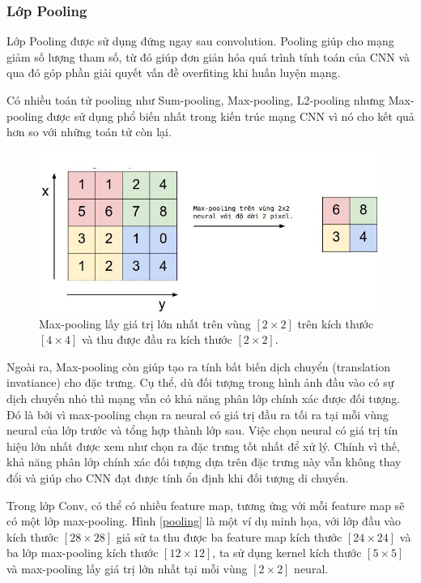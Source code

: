 \subsubsection{Lớp Pooling}
	Lớp Pooling được sử dụng đứng ngay sau convolution. Pooling giúp cho mạng giảm số lượng tham số, từ đó giúp đơn giản hóa quá trình tính toán của CNN và qua đó góp phần giải quyết vấn đề overfiting khi huấn luyện mạng. \par
	Có nhiều toán tử pooling như Sum-pooling, Max-pooling, L2-pooling nhưng Max-pooling được sử dụng phổ biến nhất trong kiến trúc mạng CNN vì nó cho kết quả hơn so với những toán tử còn lại. \par

\begin{figure}[ht]
  			\begin{center}
    				\includegraphics[scale=0.5]{maxpool} 
    				\caption{Max-pooling lấy giá trị lớn nhất trên vùng $[2\times2]$ trên kích thước $[4\times4]$ và thu được đầu ra kích thước $[2\times2]$.}
    				\label{maxpool}
  			\end{center}
\end{figure}	

	Ngoài ra, Max-pooling còn giúp tạo ra tính bất biến dịch chuyển (translation invatiance) cho đặc trưng. Cụ thể, dù đối tượng trong hình ảnh đầu vào có sự dịch chuyển nhỏ thì mạng vẫn có khả năng phân lớp chính xác được đối tượng. Đó là bởi vì max-pooling chọn ra neural có giá trị đầu ra tối ra tại mỗi vùng neural của lớp trước và tổng hợp thành lớp sau. Việc chọn neural có giá trị tín hiệu lớn nhất được xem như chọn ra đặc trưng tốt nhất để xử lý. Chính vì thế, khả năng phân lớp chính xác đối tượng dựa trên đặc trưng này vẫn không thay đổi và giúp cho CNN đạt được tính ổn định khi đối tượng di chuyển. \par
	Trong lớp Conv, có thể có nhiều feature map, tương ứng với mỗi feature map sẽ có một lớp max-pooling. Hình \ref{pooling} là một ví dụ minh họa, với lớp đầu vào kích thước $[28\times28]$ giả sử ta thu được ba feature map kích thước $[24\times24]$ và ba lớp max-pooling kích thước $[12\times12]$, ta sử dụng kernel kích thước $[5\times5]$ và max-pooling lấy giá trị lớn nhất tại mỗi vùng $[2\times2]$ neural. 
	

